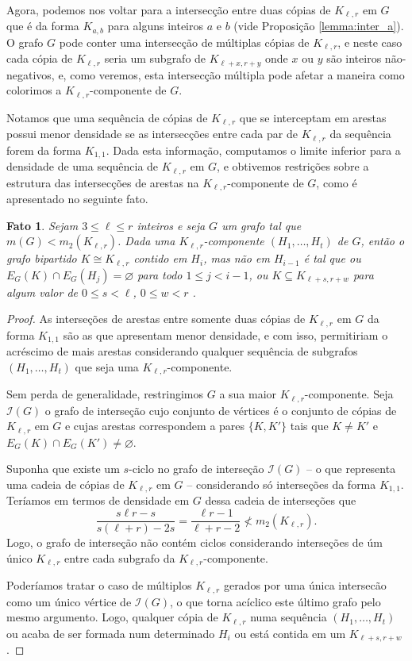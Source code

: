 \documentclass[12pt,a4paper]{book}
\newcommand{\K}{K_{\ell,r}} %
\newtheorem{fato}      [teorema] {Fato}
\begin{document}
     Agora, podemos nos voltar para a intersecção entre duas cópias de $\K$ em $G$ que é da forma $K_{a,b}$ para alguns inteiros $a$ e $b$ (vide Proposição \ref{lemma:inter_a}). 
	 O grafo $G$ pode conter uma intersecção de múltiplas cópias de
    $\K$, e neste caso cada cópia de $\K$ seria um subgrafo de $K_{\ell+x,r+y}$ onde $x$ ou $y$ são inteiros não-negativos, e, como veremos, esta intersecção múltipla pode afetar a maneira como colorimos a $\K$-componente de $G$. %
    
    Notamos que uma sequência de cópias de $\K$ que se interceptam em arestas possui menor densidade se as intersecções entre cada par de $\K$ da sequência forem da forma $K_{1,1}$. 
     Dada esta informação, computamos o limite inferior para a densidade de uma sequência de $\K$ em $G$, e obtivemos restrições sobre a estrutura das intersecções de arestas na $\K$-componente de $G$, como é apresentado no seguinte fato.
     
      \begin{fato}\label{fato:ciclos}
        Sejam $3\leq \ell \leq r$ inteiros e seja $G$ um grafo tal que $m(G) < m_2(\K)$.  
        Dada uma $\K$-componente $(H_1, \ldots, H_t)$ de $G$, 
        então o grafo bipartido $K \cong \K$ contido em $H_i$, mas não em $H_{i-1}$ é tal que ou $E_G(K) \cap E_G(H_j) = \varnothing$
        para todo $1 \leq j < i-1$, ou  $K \subseteq K_{\ell+s, r+w}$
        para algum valor de $0\leq s < \ell$, $0\leq w < r$ .  
  \end{fato}
\begin{proof}
        As interseções de arestas entre somente duas cópias de $\K$ em $G$ da forma $K_{1,1}$ são as que apresentam menor densidade, e com isso, permitiriam o acréscimo de mais arestas considerando qualquer sequência de subgrafos $(H_1, \ldots, H_t)$ que seja uma $\K$-componente. 
        
        Sem perda de generalidade, restringimos $G$ a sua maior $\K$-componente.       
         Seja $\mathcal{I}(G)$ o grafo de interseção cujo conjunto de vértices é o conjunto de cópias de $\K$ em $G$ e cujas arestas correspondem a pares $\{K, K'\}$ tais que $K \neq K'$ e $E_G(K) \cap E_G(K') \neq \varnothing$.
         
        Suponha que existe um $s$-ciclo no grafo de interseção $\mathcal{I}(G)$ -- o que representa uma cadeia de cópias de $\K$ em $G$ --  considerando só interseções da forma $K_{1,1}$.
        Teríamos em termos de densidade em $G$ dessa cadeia de interseções que
        \[
            \frac{s\ell r - s}{s(\ell+r) - 2s} =  \frac{\ell r - 1}{\ell+r - 2}
            \not < m_2(\K). 
        \]
        Logo, o grafo de interseção não contém ciclos considerando interseções de úm único $\K$ entre cada subgrafo da $\K$-componente.
        
       Poderíamos tratar o caso de múltiplos $\K$ gerados por uma única intersecão como um único vértice de $\mathcal{I}(G)$, o que torna acíclico este último grafo pelo mesmo argumento. 
       Logo, qualquer cópia de $\K$  numa sequência $(H_1, \ldots, H_t)$ ou acaba de ser formada num determinado $H_i$ ou está contida em um $K_{\ell+s, r+w}$.
\end{proof}
\end{document}
